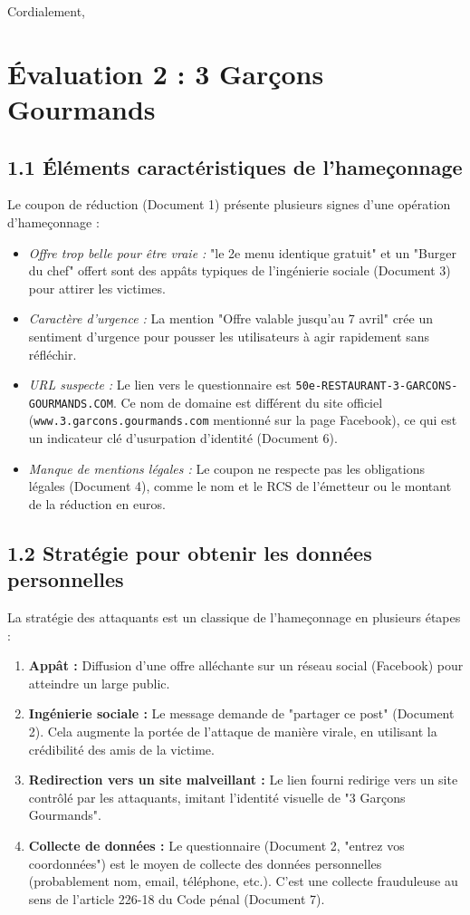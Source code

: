 \documentclass[12pt,a4paper]{article}
\begin{document}
Cordialement,

\clearpage

\section{Évaluation 2 : 3 Garçons Gourmands}

\subsection*{1.1 Éléments caractéristiques de l'hameçonnage}
Le coupon de réduction (Document 1) présente plusieurs signes d'une opération d'hameçonnage :
\begin{itemize}
    	\item \textit{Offre trop belle pour être vraie :} "le 2e menu identique gratuit" et un "Burger du chef" offert sont des appâts typiques de l'ingénierie sociale (Document 3) pour attirer les victimes.
    	\item \textit{Caractère d'urgence :} La mention "Offre valable jusqu'au 7 avril" crée un sentiment d'urgence pour pousser les utilisateurs à agir rapidement sans réfléchir.
    	\item \textit{URL suspecte :} Le lien vers le questionnaire est \texttt{50e-RESTAURANT-3-GARCONS-GOURMANDS.COM}. Ce nom de domaine est différent du site officiel (\texttt{www.3.garcons.gourmands.com} mentionné sur la page Facebook), ce qui est un indicateur clé d'usurpation d'identité (Document 6).
    	\item \textit{Manque de mentions légales :} Le coupon ne respecte pas les obligations légales (Document 4), comme le nom et le RCS de l'émetteur ou le montant de la réduction en euros.
\end{itemize}

\subsection*{1.2 Stratégie pour obtenir les données personnelles}
La stratégie des attaquants est un classique de l'hameçonnage en plusieurs étapes :
\begin{enumerate}
    	\item \textbf{Appât :} Diffusion d'une offre alléchante sur un réseau social (Facebook) pour atteindre un large public.
    	\item \textbf{Ingénierie sociale :} Le message demande de "partager ce post" (Document 2). Cela augmente la portée de l'attaque de manière virale, en utilisant la crédibilité des amis de la victime.
    	\item \textbf{Redirection vers un site malveillant :} Le lien fourni redirige vers un site contrôlé par les attaquants, imitant l'identité visuelle de "3 Garçons Gourmands".
    	\item \textbf{Collecte de données :} Le questionnaire (Document 2, "entrez vos coordonnées") est le moyen de collecte des données personnelles (probablement nom, email, téléphone, etc.). C'est une collecte frauduleuse au sens de l'article 226-18 du Code pénal (Document 7).
\end{enumerate}
\clearpage
\end{document}

